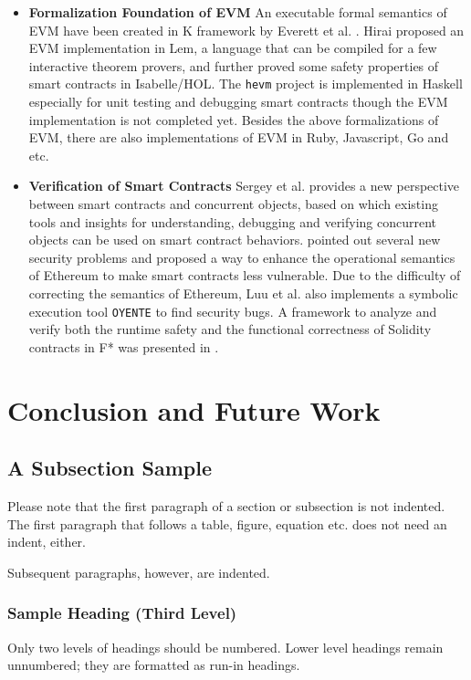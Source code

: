 \documentclass[runningheads]{llncs}
\begin{document}
\begin{itemize}
    \item \textbf{Formalization Foundation of EVM} An executable formal semantics of EVM have been created in K framework by Everett et al. \cite{hildenbrandt2017kevm}.  Hirai \cite{hirai2017defining} proposed an EVM implementation in Lem, a language that can be compiled for a few interactive theorem provers, and further proved some safety properties of smart contracts in Isabelle/HOL. The \texttt{hevm} project\cite{hevm} is implemented in Haskell especially for unit testing and debugging smart contracts though the EVM implementation is not completed yet. Besides the above formalizations of EVM, there are also implementations of EVM in Ruby\cite{cryptape}, Javascript\cite{vmjs}, Go\cite{vmgo} and etc.
    \item \textbf{Verification of Smart Contracts} Sergey et al. \cite{sergey2017concurrent} provides a new perspective between smart contracts and concurrent objects, based on which existing tools and insights for understanding, debugging and verifying concurrent objects can be used on smart contract behaviors. \cite{luu2016making} pointed out several new security problems and proposed a way to enhance the operational semantics of Ethereum to make smart contracts less vulnerable. Due to the difficulty of correcting the semantics of Ethereum, Luu et al.\cite{luu2016making} also implements a symbolic execution tool \texttt{OYENTE} to find security bugs. A framework to analyze and verify both the runtime safety and the functional correctness of Solidity contracts in F* was presented in \cite{bhargavan2016formal}.
\end{itemize} 

\section{Conclusion and Future Work}\label{Sec: Conclusion}

\subsection{A Subsection Sample}
Please note that the first paragraph of a section or subsection is
not indented. The first paragraph that follows a table, figure,
equation etc. does not need an indent, either.

Subsequent paragraphs, however, are indented.

\subsubsection{Sample Heading (Third Level)} Only two levels of
headings should be numbered. Lower level headings remain unnumbered;
they are formatted as run-in headings.
\end{document}
